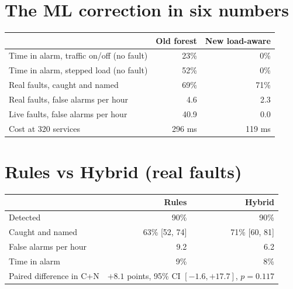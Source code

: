 \section{The ML correction in six numbers}
\begin{center}
\small
\begin{tabular}{@{}lrr@{}}
\toprule
 & Old forest & New load-aware\\
\midrule
Time in alarm, traffic on/off (no fault) & 23\% & 0\%\\
Time in alarm, stepped load (no fault) & 52\% & 0\%\\
Real faults, caught and named & 69\% & 71\%\\
Real faults, false alarms per hour & 4.6 & 2.3\\
Live faults, false alarms per hour & 40.9 & 0.0\\
Cost at 320 services & 296 ms & 119 ms\\
\bottomrule
\end{tabular}
\end{center}

\section{Rules vs Hybrid (real faults)}
\begin{center}
\small
\begin{tabular}{@{}lrr@{}}
\toprule
 & Rules & Hybrid\\
\midrule
Detected & 90\% & 90\%\\
Caught and named & 63\% [52, 74] & 71\% [60, 81]\\
False alarms per hour & 9.2 & 6.2\\
Time in alarm & 9\% & 8\%\\
Paired difference in C+N & \multicolumn{2}{c}{$+8.1$ points, 95\% CI $[-1.6,+17.7]$, $p=0.117$}\\
\bottomrule
\end{tabular}
\end{center}

